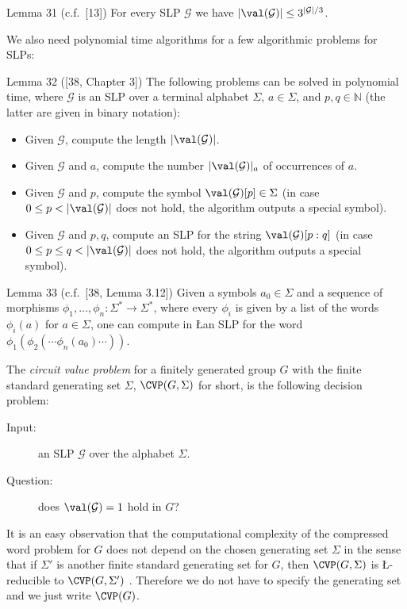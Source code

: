 \begin{authorclaim}{Lemma 31 (c.f.\ [13])} \label{lemma-SLP-upper-bound}
For every SLP $\mathcal{G}$ we have $|\val(\mathcal{G})| \leq  3^{|\mathcal{G}|/3}$.
\end{authorclaim}
We also need polynomial time algorithms for a few algorithmic problems for SLPs:

\begin{authorclaim}{Lemma 32 ([38, Chapter 3])} \label{lemma-basic}
The following problems can be solved in polynomial time, where $\mathcal{G}$ is an SLP over a terminal alphabet $\Sigma$, $a \in \Sigma$, and $p, q \in \mathbb{N}$
(the latter are given in binary notation):
\begin{itemize}
\item Given $\mathcal{G}$, compute the length $|\val(\mathcal{G})|$.
\item Given $\mathcal{G}$ and $a$, compute the number $|\val(\mathcal{G})|_a$ of occurrences of $a$.
\item Given $\mathcal{G}$ and $p$, compute the symbol $\val(\mathcal{G})[p] \in \Sigma$ (in case $0 \le p < |\val(\mathcal{G})|$ does not hold, the algorithm outputs a special symbol).
\item Given $\mathcal{G}$ and $p,q$, compute an SLP for the string $\val(\mathcal{G})[p:q]$ (in case $0 \le p \leq q < |\val(\mathcal{G})|$ does not hold, the algorithm
outputs a special symbol).
\end{itemize}
\end{authorclaim}

\begin{authorclaim}{Lemma 33 (c.f.\ [38, Lemma 3.12])}  \label{lemma-SLP-iterated-morph}
Given a symbols $a_0 \in \Sigma$ and a sequence of morphisms $\phi_1, \ldots, \phi_n : \Sigma^* \to \Sigma^*$, where every $\phi_i$ is given by a list of the words
$\phi_i(a)$ for $a \in \Sigma$, one can compute in \L an SLP for the word
$\phi_1(\phi_2( \cdots \phi_n(a_0) \cdots))$.
\end{authorclaim}
The {\em circuit value problem} for a finitely generated group $G$ with the finite standard generating set $\Sigma$, $\CVP(G,\Sigma)$ for short,
is the following decision problem:
\begin{description}
\item[Input:]  an SLP $\mathcal{G}$ over the alphabet $\Sigma$.
\item [Question:] does $\val(\mathcal{G})=1$ hold in $G$?
\end{description}
It is an easy observation that the computational complexity of the compressed word 
problem for $G$ does not depend on the chosen generating set $\Sigma$ in the sense
that if $\Sigma'$ is another finite standard generating set for $G$, then $\CVP(G,\Sigma)$
is \L-reducible to $\CVP(G,\Sigma')$ \cite[Lemma~4.2]{ref38}. Therefore we do not
have to specify the generating set and we just write $\CVP(G)$.

